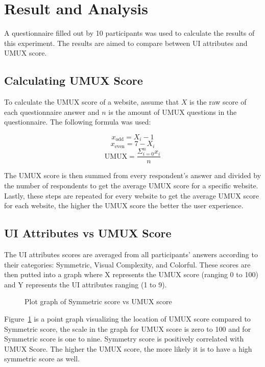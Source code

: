 \documentclass[conference]{IEEEtran}
\begin{document}
\section{Result and Analysis}

A questionnaire filled out by 10 participants was used to calculate the results of this experiment. The results are aimed to compare between UI attributes and UMUX score.

\subsection{Calculating UMUX Score}

To calculate the UMUX score of a website, assume that \(X\) is the raw score of each questionnaire answer and \(n\) is the amount of UMUX questions in the questionnaire. The following formula was used:

\[x_{\text{odd}} = X_i - 1\]
\[x_{\text{even}} = 7 - X_i\]
\[\text{UMUX} = \frac{\Sigma^{n}_{i=0}x_i}{n}\]

The UMUX score is then summed from every respondent's answer and divided by the number of respondents to get the average UMUX score for a specific website. Lastly, these steps are repeated for every website to get the average UMUX score for each website, the higher the UMUX score the better the user experience.

\subsection{UI Attributes vs UMUX Score}

The UI attributes scores are averaged from all participants' answers according to their categories: Symmetric, Visual Complexity, and Colorful. These scores are then putted into a graph where X represents the UMUX score (ranging 0 to 100) and Y represents the UI attributes ranging (1 to 9).

\begin{figure}[!ht]
    \centering
    \scalebox{0.39}{
        
    }
    \caption{Plot graph of Symmetric score vs UMUX score}
    \label{fig:symmetricumux}
\end{figure}

Figure~\ref{fig:symmetricumux} is a point graph visualizing the location of UMUX score compared to Symmetric score, the scale in the graph for UMUX score is zero to 100 and for Symmetric score is one to nine. Symmetry score is positively correlated with UMUX Score. The higher the UMUX score, the more likely it is to have a high symmetric score as well.
\end{document}

